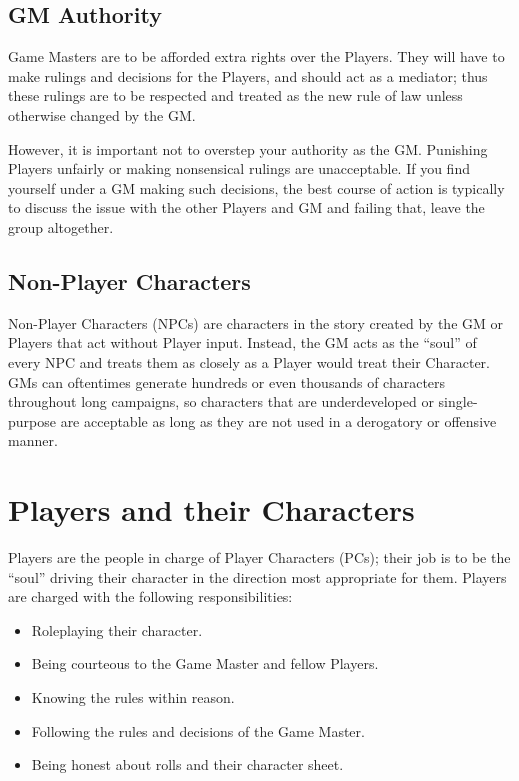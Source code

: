 \documentclass[../main.tex]{subfiles}
\begin{document}
    \subsection{GM Authority}
    Game Masters are to be afforded extra rights over the Players. They will have to make rulings and decisions for the Players, and should act as a mediator; thus these rulings are to be respected and treated as the new rule of law unless otherwise changed by the GM.

    However, it is important not to overstep your authority as the GM. Punishing Players unfairly or making nonsensical rulings are unacceptable. If you find yourself under a GM making such decisions, the best course of action is typically to discuss the issue with the other Players and GM and failing that, leave the group altogether.

    \subsection{Non-Player Characters}
    Non-Player Characters (NPCs) are characters in the story created by the GM or Players that act without Player input. Instead, the GM acts as the ``soul'' of every NPC and treats them as closely as a Player would treat their Character. GMs can oftentimes generate hundreds or even thousands of characters throughout long campaigns, so characters that are underdeveloped or single-purpose are acceptable as long as they are not used in a derogatory or offensive manner.

    \section{Players and their Characters}

    Players are the people in charge of Player Characters (PCs); their job is to be the ``soul'' driving their character in the direction most appropriate for them. Players are charged with the following responsibilities:

    \begin{itemize}
        \item Roleplaying their character.
        \item Being courteous to the Game Master and fellow Players.
        \item Knowing the rules within reason.
        \item Following the rules and decisions of the Game Master.
        \item Being honest about rolls and their character sheet.
    \end{itemize}
\end{document}
